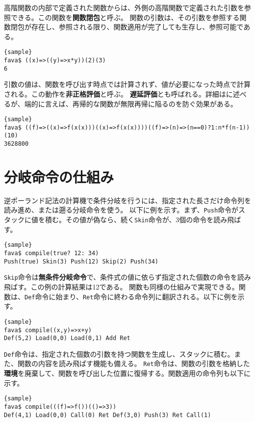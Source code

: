 \documentclass[10pt,a4paper]{book}
\begin{document}
高階関数の内部で定義された関数からは、外側の高階関数で定義された引数を参照できる。この関数を\textbf{関数閉包}と呼ぶ。
関数の引数は、その引数を参照する関数閉包が存在し、参照される限り、関数適用が完了しても生存し、参照可能である。

\begin{Verbatim}{sample}
fava$ ((x)=>((y)=>x*y))(2)(3)
6
\end{Verbatim}

引数の値は、関数を呼び出す時点では計算されず、値が必要になった時点で計算される。この動作を\textbf{非正格評価}と呼ぶ。
\textbf{遅延評価}とも呼ばれる。詳細はに述べるが、端的に言えば、再帰的な関数が無限再帰に陥るのを防ぐ効果がある。

\begin{Verbatim}{sample}
fava$ ((f)=>((x)=>f(x(x)))((x)=>f(x(x))))((f)=>(n)=>(n==0)?1:n*f(n-1))(10)
3628800
\end{Verbatim}

\chapter{分岐命令の仕組み\label{chap:call}}

逆ポーランド記法の計算機で条件分岐を行うには、指定された長さだけ命令列を読み進め、または遡る分岐命令を使う。
以下に例を示す。まず、\texttt{Push}命令がスタックに値を積む。その値が偽なら、続く\texttt{Skin}命令が、3個の命令を読み飛ばす。

\begin{Verbatim}{sample}
fava$ compile(true? 12: 34)
Push(true) Skin(3) Push(12) Skip(2) Push(34)
\end{Verbatim}

\texttt{Skip}命令は\textbf{無条件分岐命令}で、条件式の値に依らず指定された個数の命令を読み飛ばす。この例の計算結果は12である。
関数も同様の仕組みで実現できる。関数は、\texttt{Def}命令に始まり、\texttt{Ret}命令に終わる命令列に翻訳される。以下に例を示す。

\begin{Verbatim}{sample}
fava$ compile((x,y)=>x+y)
Def(5,2) Load(0,0) Load(0,1) Add Ret
\end{Verbatim}

\texttt{Def}命令は、指定された個数の引数を持つ関数を生成し、スタックに積む。また、関数の内容を読み飛ばす機能も備える。
\texttt{Ret}命令は、関数の引数を格納した\textbf{環境}を廃棄して、関数を呼び出した位置に復帰する。関数適用の命令列も以下に示す。

\begin{Verbatim}{sample}
fava$ compile(((f)=>f())(()=>3))
Def(4,1) Load(0,0) Call(0) Ret Def(3,0) Push(3) Ret Call(1)
\end{Verbatim}
\end{document}
